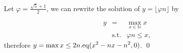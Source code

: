 
\begin{pf} \rm
Let $\varphi = \frac{\sqrt{5}+1}{2}$, we can rewrite the solution of 
$y=\lfloor \varphi n\rfloor$ by

\[
\begin{array}{rcl}
 y &= & \displaystyle \max_{x\in\mathbb{N}} x \\
 & \mathrm{s.t.} & \varphi n \leq x,
\end{array}
\]
\noindent
therefore
$ \displaystyle y = 
 \max x \leq 2n.
\mathrm{eq}(x^2 - nx - n^2, 0)
 $.
\qed
\end{pf}

